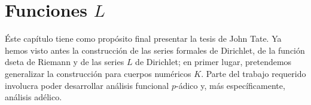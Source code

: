 \documentclass[teoria-numeros.tex]{subfiles}
\begin{document}
\chapter{Funciones $L$}
Éste capítulo tiene como propósito final presentar la tesis de John Tate.
Ya hemos visto antes la construcción de las series formales de Dirichlet, de la función dseta de Riemann y de las series $L$ de Dirichlet;
en primer lugar, pretendemos generalizar la construcción para cuerpos numéricos $K$.
Parte del trabajo requerido involucra poder desarrollar análisis funcional $p$-ádico y, más específicamente, análisis adélico.

\end{document}
